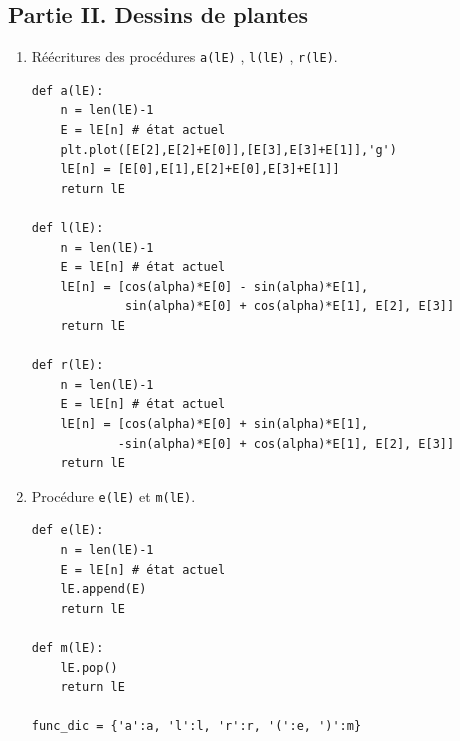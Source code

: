 \subsection*{Partie II. Dessins de plantes}
\begin{enumerate}
 \item Réécritures des procédures \verb|a(lE)| , \verb|l(lE)| , \verb|r(lE)|.
\begin{verbatim}
def a(lE):
    n = len(lE)-1
    E = lE[n] # état actuel
    plt.plot([E[2],E[2]+E[0]],[E[3],E[3]+E[1]],'g')
    lE[n] = [E[0],E[1],E[2]+E[0],E[3]+E[1]] 
    return lE
    
def l(lE):
    n = len(lE)-1
    E = lE[n] # état actuel
    lE[n] = [cos(alpha)*E[0] - sin(alpha)*E[1],
             sin(alpha)*E[0] + cos(alpha)*E[1], E[2], E[3]]
    return lE

def r(lE):
    n = len(lE)-1
    E = lE[n] # état actuel
    lE[n] = [cos(alpha)*E[0] + sin(alpha)*E[1],
            -sin(alpha)*E[0] + cos(alpha)*E[1], E[2], E[3]]
    return lE
\end{verbatim}

\item Procédure \verb|e(lE)| et \verb|m(lE)|.
\begin{verbatim}
def e(lE):
    n = len(lE)-1
    E = lE[n] # état actuel
    lE.append(E)
    return lE

def m(lE):
    lE.pop()
    return lE
    
func_dic = {'a':a, 'l':l, 'r':r, '(':e, ')':m}
\end{verbatim}


\end{enumerate}
